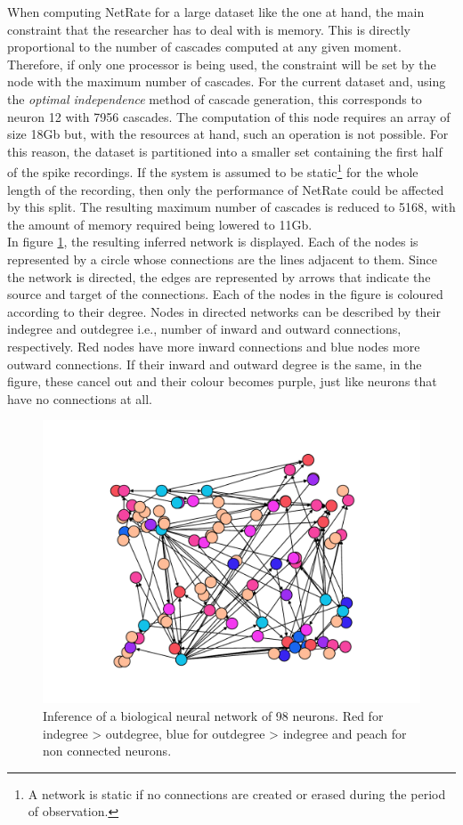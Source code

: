 When computing NetRate for a large dataset like the one at hand, the main constraint that the researcher has to deal with is memory. This is directly proportional to the number of cascades computed at any given moment. Therefore, if only one processor is being used, the constraint will be set by the node with the maximum number of cascades. For the current dataset and, using the \textit{optimal independence} method of cascade generation, this corresponds to neuron 12 with 7956 cascades. The computation of this node requires an array of size 18Gb but, with the resources at hand, such an operation is not possible. For this reason, the dataset is partitioned into a smaller set containing the first half of the spike recordings. If the system is assumed to be static\footnote{A network is static if no connections are created or erased during the period of observation.} for the whole length of the recording, then only the performance of NetRate could be affected by this split. The resulting maximum number of cascades is reduced to 5168, with the amount of memory required being lowered to 11Gb.\\

In figure \ref{fig:crcns_4_network}, the resulting inferred network is displayed. Each of the nodes is represented by a circle whose connections are the lines adjacent to them. Since the network is directed, the edges are represented by arrows that indicate the source and target of the connections. Each of the nodes in the figure is coloured according to their degree. Nodes in directed networks can be described by their indegree and outdegree i.e., number of inward and outward connections, respectively. Red nodes have more inward connections and blue nodes more outward connections. If their inward and outward degree is the same, in the figure, these cancel out and their colour becomes purple, just like neurons that have no connections at all. \\

\begin{figure}
	\centering
	\includegraphics[width=0.8\linewidth]{crcns_4_50_xy.pdf}
	\caption{Inference of a biological neural network of 98 neurons. Red for indegree > outdegree, blue for outdegree > indegree and peach for non connected neurons.}
	\label{fig:crcns_4_network}
\end{figure}


